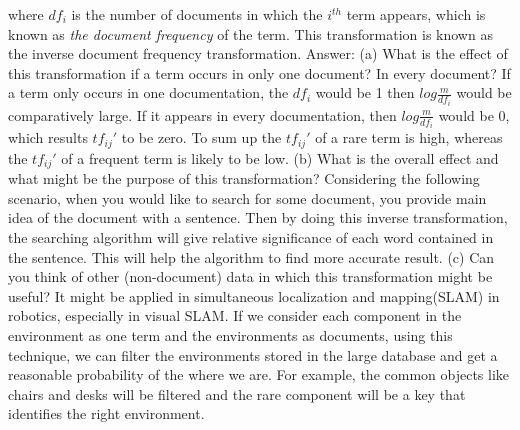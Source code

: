 \documentclass[paper=a4, fontsize=11pt]{scrartcl} %
\numberwithin{equation}{section} %
\numberwithin{figure}{section} %
\numberwithin{table}{section} %
\begin{document}
where $df_i$ is the number of documents in which the $i^	{th}$ term appears, which is known as \textit{the document frequency} of the term. This transformation is known as the inverse document frequency transformation.
\newline
\newline
Answer:
\newline
\newline
(a) What is the effect of this transformation if a term occurs in only one document? In every document?
\newline
\newline
If a term only occurs in one documentation, the $df_i$ would be 1 then $log\frac{m}{df_i}$ would be comparatively large. If it appears in every documentation, then $log\frac{m}{df_i}$ would be 0, which results $tf_{ij}'$ to be zero. To sum up the $tf_{ij}'$ of a rare term is high, whereas the $tf_{ij}'$ of a frequent term is likely to be low. 
\newline
\newline
(b) What is the overall effect and what might be the purpose of this transformation?
\newline
\newline
Considering the following scenario, when you would like to search for some document, you provide main idea of the document with a sentence. Then by doing this inverse transformation, the searching algorithm will give relative significance of each word contained in the sentence. This will help the algorithm to find more accurate result. 
\newline
\newline
(c) Can you think of other (non-document) data in which this transformation might be useful?
\newline
\newline
It might be applied in simultaneous localization and mapping(SLAM) in robotics, especially in visual SLAM. If we consider each component in the environment as one term and the environments as documents, using this technique, we can filter the environments stored in the large database and get a reasonable probability of the where we are. For example, the common objects like chairs and desks will be filtered and the rare component will be a key that identifies the right environment.
\end{document}
